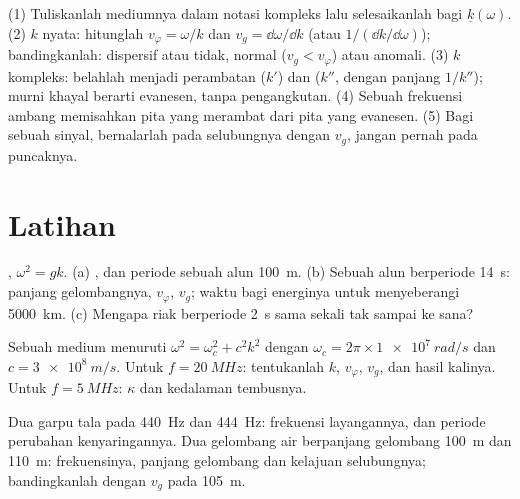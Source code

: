 \begin{method}\label{met:b2:dispersion-wave-packets:method}
(1) Tuliskanlah  mediumnya dalam notasi kompleks lalu
selesaikanlah bagi $\underline k(\omega)$. (2) $k$ nyata: hitunglah $v_\varphi = \omega/k$ dan
$v_g = \dd\omega/\dd k$ (atau $1/(\dd k/\dd\omega)$); bandingkanlah: dispersif atau tidak,
normal ($v_g < v_\varphi$) atau anomali. (3) $k$ kompleks: belahlah menjadi
perambatan ($k'$) dan  ($k''$, dengan panjang $1/k''$); murni
khayal berarti evanesen, tanpa pengangkutan. (4) Sebuah frekuensi ambang
memisahkan pita yang merambat dari pita yang evanesen. (5) Bagi sebuah sinyal,
bernalarlah pada selubungnya dengan $v_g$, jangan pernah pada puncaknya.
\end{method}

\section{Latihan}

\begin{exercise}[$\star$]\label{exo:b2:dispersion-wave-packets:1}
, $\omega^2 = gk$. (a) ,  dan
periode sebuah alun \qty{100}{m}. (b) Sebuah alun berperiode \qty{14}{s}:
panjang gelombangnya, $v_\varphi$, $v_g$; waktu bagi energinya untuk menyeberangi \qty{5000}{km}.
(c) Mengapa riak berperiode \qty{2}{s} sama sekali tak sampai ke sana?
\end{exercise}

\begin{exercise}[$\star$]\label{exo:b2:dispersion-wave-packets:2}
Sebuah medium menuruti $\omega^2 = \omega_c^2 + c^2k^2$ dengan $\omega_c = 2\pi \times \qty{1e7}{rad/s}$
dan $c = \qty{3e8}{m/s}$. Untuk $f = \qty{20}{MHz}$: tentukanlah $k$, $v_\varphi$, $v_g$, dan
hasil kalinya. Untuk $f = \qty{5}{MHz}$: $\kappa$ dan kedalaman tembusnya.
\end{exercise}

\begin{exercise}[$\star$]\label{exo:b2:dispersion-wave-packets:3}
Dua garpu tala pada \qty{440}{Hz} dan \qty{444}{Hz}: frekuensi layangannya, dan
periode perubahan kenyaringannya. Dua gelombang air berpanjang gelombang
\qty{100}{m} dan \qty{110}{m}: frekuensinya, panjang gelombang dan kelajuan
selubungnya; bandingkanlah dengan $v_g$ pada \qty{105}{m}.
\end{exercise}

